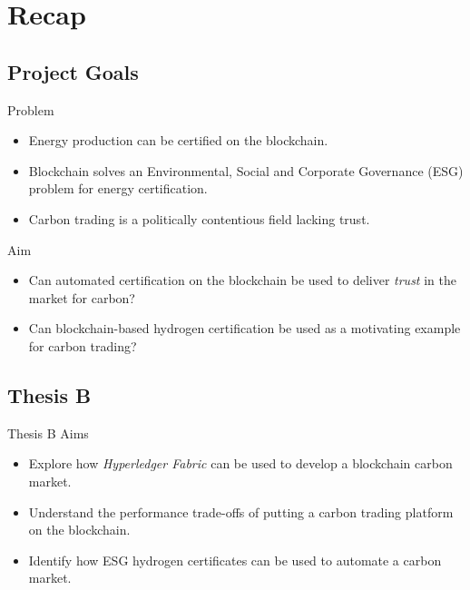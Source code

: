\section{Recap}
\subsection{Project Goals}
\begin{frame}{Problem}
    \begin{itemize}
        \item Energy production can be certified on the blockchain.
        \item Blockchain solves an Environmental,
              Social and Corporate Governance (ESG)
              problem for energy certification.
        \item Carbon trading is a politically contentious field lacking trust.
    \end{itemize}
\end{frame}
\begin{frame}{Aim}
    \begin{itemize}
        \item Can automated certification
              on the blockchain be used to deliver \textit{trust} in the market
              for carbon?
        \item Can blockchain-based hydrogen certification be used as a motivating
              example for carbon trading?
    \end{itemize}
\end{frame}
\subsection{Thesis B}
\begin{frame}{Thesis B Aims}
    \begin{itemize}
        \item Explore how \textit{Hyperledger Fabric} can be used to develop
              a blockchain carbon market.
        \item Understand the performance trade-offs
              of putting a carbon trading platform
              on the blockchain.
        \item Identify how ESG hydrogen certificates can be used to automate
              a carbon market.
    \end{itemize}
\end{frame}